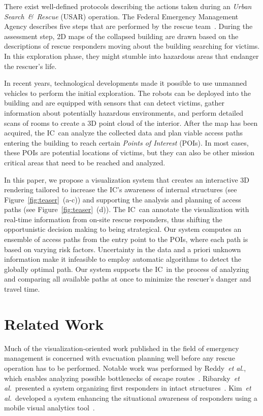 \documentclass{egpubl}
\def\etal{\textit{et al.}}
\def\IC{IC}
\begin{document}
There exist well-defined protocols describing the actions taken during an \emph{Urban Search~\&~Rescue} (USAR) operation. The Federal Emergency Management Agency describes five steps that are performed by the rescue team~\cite{fema08}. During the assessment step, 2D maps of the collapsed building are drawn based on the descriptions of rescue responders moving about the building searching for victims. In this exploration phase, they might stumble into hazardous areas that endanger the rescuer's life.

In recent years, technological developments made it possible to use unmanned vehicles to perform the initial exploration. The robots can be deployed into the building and are equipped with sensors that can detect victims, gather information about potentially hazardous environments, and perform detailed scans of rooms to create a 3D point cloud of the interior. After the map has been acquired, the \IC\ can analyze the collected data and plan viable access paths entering the building to reach certain \emph{Points of Interest} (POIs). In most cases, these POIs are potential locations of victims, but they can also be other mission critical areas that need to be reached and analyzed.

In this paper, we propose a visualization system that creates an interactive 3D rendering tailored to increase the \IC 's awareness of internal structures (see Figure~\ref{fig:teaser}~(a-c)) and supporting the analysis and planning of access paths (see Figure~\ref{fig:teaser}~(d)). The \IC\ can annotate the visualization with real-time information from on-site rescue responders, thus shifting the opportunistic decision making to being strategical. Our system computes an ensemble of access paths from the entry point to the POIs, where each path is based on varying risk factors. Uncertainty in the data and a priori unknown information make it infeasible to employ automatic algorithms to detect the globally optimal path. Our system supports the \IC\ in the process of analyzing and comparing all available paths at once to minimize the rescuer's danger and travel time.


\section{Related Work} \label{sec:relatedwork}
 Much of the visualization-oriented work published in the field of emergency management is concerned with evacuation planning well before any rescue operation has to be performed. Notable work was performed by Reddy~\etal, which enables analyzing possible bottlenecks of escape routes~\cite{EuroVA12:13-17:2012}. Ribarsky~\etal\ presented a system organizing first responders in intact structures~\cite{Ribarsky:2010}. Kim~\etal\ developed a system enhancing the situational awareness of responders using a mobile visual analytics tool~\cite{Kim:2008}.
\end{document}
